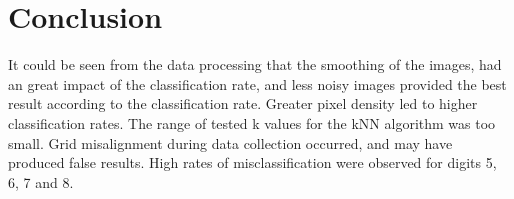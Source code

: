 \chapter{Conclusion}
It could be seen from the data processing
that the smoothing of the images,
had an great impact of the classification rate,
and  less noisy images provided the best result according to the classification rate.
Greater pixel density led to higher classification rates.
The range of tested k values for the kNN algorithm was too small.
Grid misalignment during data collection occurred, and may have produced false results.
High rates of misclassification were observed for digits 5, 6, 7 and 8.